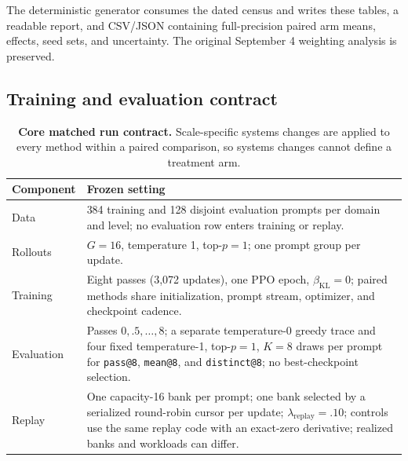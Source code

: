 \documentclass{article}
\newcommand{\1}{\mathbf 1}
\theoremstyle{remark}
\theoremstyle{definition}
\theoremstyle{plain}
\begin{document}
The deterministic generator
 consumes the
dated census and writes these tables, a readable report, and CSV/JSON
containing full-precision paired arm means, effects, seed sets, and
uncertainty. The original September 4 weighting analysis is preserved.


\subsection{Training and evaluation contract}
\label{app:repro-run-contract}

\begin{table}[H]
  \centering
  \caption{\textbf{Core matched run contract.} Scale-specific systems changes
  are applied to every method within a paired comparison, so systems changes
  cannot define a treatment arm.}
  \label{tab:run-contract}
  \small
  \begin{tabularx}{\linewidth}{@{}P{.24\linewidth}Y@{}}
    \toprule
    \textbf{Component} & \textbf{Frozen setting} \\
    \midrule
    Data & 384 training and 128 disjoint evaluation prompts per domain and
      level; no evaluation row enters training or replay. \\
    Rollouts & $G=16$, temperature 1, top-$p=1$; one prompt group per update. \\
    Training & Eight passes (3,072 updates), one PPO epoch,
      $\beta_{\mathrm{KL}}=0$; paired methods share initialization, prompt stream,
      optimizer, and checkpoint cadence. \\
    Evaluation & Passes $0,.5,\ldots,8$; a separate temperature-0 greedy
      trace and four fixed temperature-1, top-$p=1$, $K=8$ draws per prompt for
      \texttt{pass@8}, \texttt{mean@8}, and \texttt{distinct@8}; no
      best-checkpoint selection. \\
    Replay & One capacity-16 bank per prompt; one bank selected by a serialized
      round-robin cursor per update; $\lambda_{\mathrm{replay}}=.10$; controls
      use the same replay code with an exact-zero derivative; realized banks and workloads can differ. \\
    \bottomrule
  \end{tabularx}
\end{table}
\end{document}
